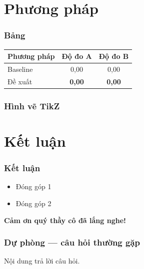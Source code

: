 \documentclass[aspectratio=169]{beamer}
\begin{document}
\section{Phương pháp}

\begin{frame}
\frametitle{Bảng}
\begin{center}
\begin{tabular}{@{}lcc@{}}
  \toprule
  Phương pháp & Độ đo A & Độ đo B \\
  \midrule
  Baseline   & 0{,}00 & 0{,}00 \\
  Đề xuất    & \textbf{0{,}00} & \textbf{0{,}00} \\
  \bottomrule
\end{tabular}
\end{center}
\end{frame}

\begin{frame}
\frametitle{Hình vẽ TikZ}
\begin{center}
\end{center}
\end{frame}

\section{Kết luận}

\begin{frame}
\frametitle{Kết luận}
\begin{itemize}
  \item Đóng góp 1
  \item Đóng góp 2
\end{itemize}
\vspace{0.5cm}
\begin{center}
{\Large \textbf{Cảm ơn quý thầy cô đã lắng nghe!}}
\end{center}
    \label{endmain}   %
\end{frame}

\appendix

\begin{frame}
\frametitle{Dự phòng --- câu hỏi thường gặp}
Nội dung trả lời câu hỏi.
\end{frame}
\end{document}

